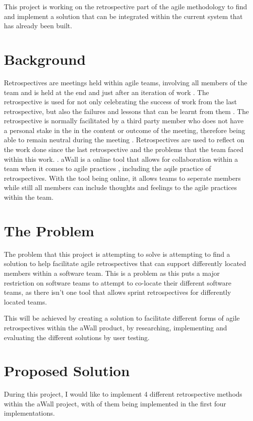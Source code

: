 \documentclass[11pt, a4paper, twoside, openright]{report}
\begin{document}
This project is working on the retrospective part of the agile methodology to find and implement a solution that can be integrated within the current system that has already been built.  

\section*{Background}
Retrospectives are meetings held within agile teams, involving all members of the team and is held at the end and just after an iteration of work \cite{AgileRetrospectivesEstherDerby,GettingValueFromRetrospectives}. The retrospective is used for not only celebrating the success of work from the last retrospective, but also the failures and lessons that can be learnt from them \cite {normanKeith}. The retrospective is normally facilitated by a third party member who does not have a personal stake in the in the content or outcome of the meeting, therefore being able to remain neutral during the meeting \cite{normanKeith,retrospectiveFacilator}. Retrospectives are used to reflect on the work done since the last retrospective and the problems that the team faced within this work. \cite{AgileRetrospectivesEstherDerby}. aWall is a online tool that allows for collaboration within a team when it comes to agile practices \cite{xp2017_aWall}, including the aqile practice of retrospectives. With the tool being online, it allows teams to seperate members while still all members can include thoughts and feelings to the agile practices within the team.  

\section*{The Problem}

The problem that this project is attempting to solve is attempting to find a solution to help facilitate agile retrospectives that can support differently located members within a software team. This is a problem as this puts a major restriction on software teams to attempt to co-locate their different software teams, as there isn’t one tool that allows sprint retrospectives for differently located teams. 

This will be achieved by creating a solution to facilitate different forms of agile retrospectives within the aWall product, by researching, implementing and evaluating the different solutions by user testing.

\section*{Proposed Solution}
During this project, I would like to implement 4 different retrospective methods within the aWall project, with of them being implemented in the first four implementations.
\end{document}
